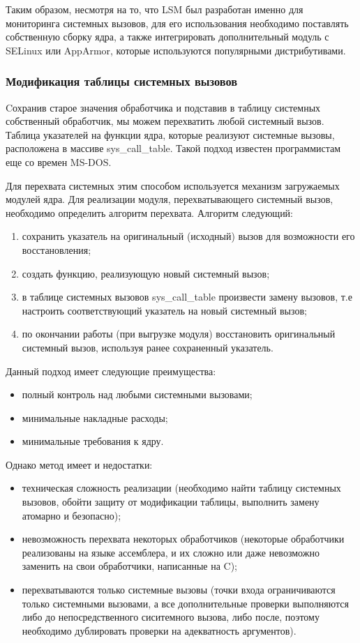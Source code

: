 \documentclass[a4paper,14pt]{article}
\begin{document}
Таким образом, несмотря на то, что LSM был разработан именно для мониторинга системных вызовов, для его использования необходимо поставлять собственную сборку ядра, а также интегрировать дополнительный модуль с SELinux или AppArmor, которые используются популярными дистрибутивами.

\subsubsection{Модификация таблицы системных вызовов}

Cохранив старое значения обработчика и подставив в таблицу системных собственный обработчик, мы можем перехватить любой системный вызов. Таблица указателей на функции ядра, которые реализуют системные вызовы, расположена в
массиве sys\_call\_table. Такой подход известен программистам еще со времен MS-DOS.

Для перехвата системных этим способом используется механизм загружаемых модулей ядра. Для реализации модуля, перехватывающего системный вызов, необходимо определить алгоритм перехвата. Алгоритм следующий:

\begin{enumerate}
	\item сохранить указатель на оригинальный (исходный) вызов для возможности его восстановления;
	\item создать функцию, реализующую новый системный вызов;
	\item в таблице системных вызовов sys\_call\_table произвести замену вызовов, т.е настроить соответствующий указатель на новый системный вызов;
	\item по окончании работы (при выгрузке модуля) восстановить оригинальный
	системный вызов, используя ранее сохраненный указатель.
\end{enumerate}

Данный подход имеет следующие преимущества:

\begin{itemize}
	\item полный контроль над любыми системными вызовами;
	\item минимальные накладные расходы;
	\item минимальные требования к ядру.
\end{itemize}

Однако метод имеет и недостатки:

\begin{itemize}
	\item техническая сложность реализации (необходимо найти таблицу системных вызовов, обойти защиту от модификации таблицы, выполнить замену атомарно и безопасно);
	\item невозможность перехвата некоторых обработчиков (некоторые обработчики реализованы на языке ассемблера, и их сложно или даже невозможно заменить на свои обработчики, написанные на C);
	\item перехватываются только системные вызовы (точки входа ограничиваются только системными вызовами, а все дополнительные проверки выполняются либо до непосредственного сиситемного вызова, либо после, поэтому необходимо дублировать проверки на адекватность аргументов).
\end{itemize}
\end{document}

